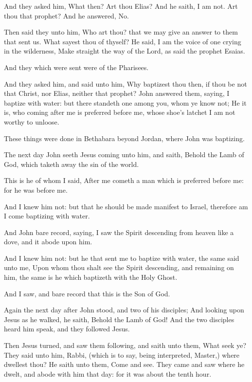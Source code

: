 \verse And they asked him, What then? Art thou Elias? And he saith, I am not. Art thou that prophet? And he answered, No.

\verse Then said they unto him, Who art thou? that we may give an answer to them that sent us. What sayest thou of thyself?  \verse He said, I am the voice of one crying in the wilderness, Make straight the way of the Lord, as said the prophet Esaias.

\verse And they which were sent were of the Pharisees.

\verse And they asked him, and said unto him, Why baptizest thou then, if thou be not that Christ, nor Elias, neither that prophet?  \verse John answered them, saying, I baptize with water: but there standeth one among you, whom ye know not; \verse He it is, who coming after me is preferred before me, whose shoe's latchet I am not worthy to unloose.

\verse These things were done in Bethabara beyond Jordan, where John was baptizing.

\verse The next day John seeth Jesus coming unto him, and saith, Behold the Lamb of God, which taketh away the sin of the world.

\verse This is he of whom I said, After me cometh a man which is preferred before me: for he was before me.

\verse And I knew him not: but that he should be made manifest to Israel, therefore am I come baptizing with water.

\verse And John bare record, saying, I saw the Spirit descending from heaven like a dove, and it abode upon him.

\verse And I knew him not: but he that sent me to baptize with water, the same said unto me, Upon whom thou shalt see the Spirit descending, and remaining on him, the same is he which baptizeth with the Holy Ghost.

\verse And I saw, and bare record that this is the Son of God.

\verse Again the next day after John stood, and two of his disciples; \verse And looking upon Jesus as he walked, he saith, Behold the Lamb of God!  \verse And the two disciples heard him speak, and they followed Jesus.

\verse Then Jesus turned, and saw them following, and saith unto them, What seek ye? They said unto him, Rabbi, (which is to say, being interpreted, Master,) where dwellest thou?  \verse He saith unto them, Come and see. They came and saw where he dwelt, and abode with him that day: for it was about the tenth hour.

